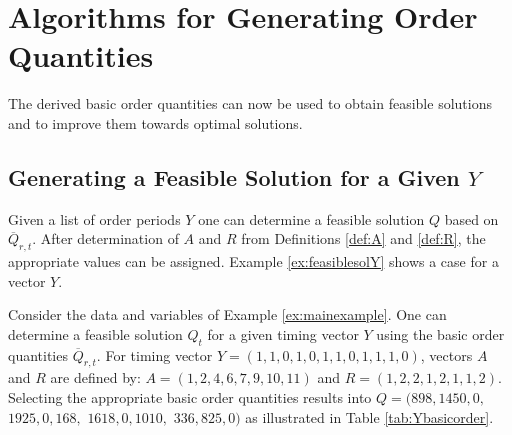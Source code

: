 \section{Algorithms for Generating Order Quantities}
\label{sec:alg}

The derived basic order quantities can now be used to obtain feasible solutions and to improve them towards optimal solutions.

\subsection{Generating a Feasible Solution for a Given $Y$}
Given a list of order periods $Y$ one can determine a feasible solution $Q$ based on $\overline{Q}_{r,t}$.  After determination of $A$ and $R$ from Definitions \ref{def:A} and \ref{def:R}, the appropriate values can be assigned. Example \ref{ex:feasiblesolY} shows a case for a vector $Y$.


\begin{example}
\label{ex:feasiblesolY}
Consider the data and variables of Example \ref{ex:mainexample}. One can determine a feasible solution $Q_t$ for a given timing vector $Y$ using the basic order quantities $\overline Q_{r,t}$. For timing vector $Y=(1,1,0,1,0,1,1,0,1,1,1,0)$, vectors $A$ and $R$ are defined by: $A=(1,2,4,6,7,9,10,11)$ and $R=(1,2,2,1,2,1,1,2)$. Selecting the appropriate basic order quantities results into  $Q=(898,1450,0,$ $1925,0,168,$ $1618,0,1010,$ $336,825,0)$ as illustrated in Table \ref{tab:Ybasicorder}.
\end{example}




